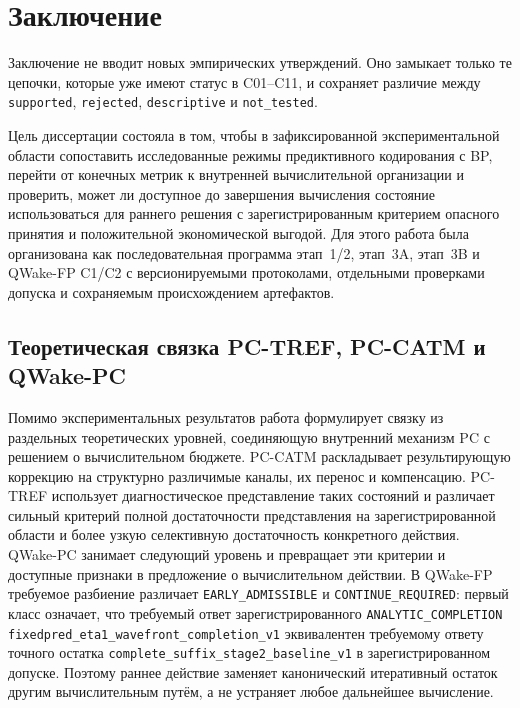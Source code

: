 \chapter{Заключение}
\label{ch:conclusion}

Заключение не вводит новых эмпирических утверждений. Оно замыкает только те
цепочки, которые уже имеют статус в C01--C11, и сохраняет различие между
\texttt{supported}, \texttt{rejected}, \texttt{descriptive} и
\texttt{not\_tested}.

Цель диссертации состояла в том, чтобы в зафиксированной экспериментальной
области сопоставить исследованные режимы предиктивного кодирования с BP,
перейти от конечных метрик к внутренней вычислительной организации и проверить,
может ли доступное до завершения вычисления состояние использоваться для
раннего решения с зарегистрированным критерием опасного принятия и положительной
экономической выгодой. Для этого работа была
организована как последовательная программа этап~1/2, этап~3A, этап~3B и
QWake-FP C1/C2 с версионируемыми протоколами, отдельными проверками допуска и
сохраняемым происхождением артефактов.

\section{Теоретическая связка PC-TREF, PC-CATM и QWake-PC}

Помимо экспериментальных результатов работа формулирует связку из раздельных
теоретических уровней, соединяющую внутренний механизм PC с решением о
вычислительном бюджете. PC-CATM раскладывает результирующую коррекцию
на структурно различимые каналы, их перенос и компенсацию. PC-TREF использует
диагностическое представление таких состояний и различает сильный критерий
полной достаточности представления на зарегистрированной области и более узкую селективную достаточность
конкретного действия. QWake-PC занимает следующий уровень и превращает эти
критерии и доступные признаки в предложение о вычислительном действии. В
QWake-FP требуемое разбиение различает \texttt{EARLY\_ADMISSIBLE} и
\texttt{CONTINUE\_REQUIRED}: первый класс означает, что требуемый ответ
зарегистрированного \texttt{ANALYTIC\_COMPLETION}
\nolinkurl{fixedpred_eta1_wavefront_completion_v1} эквивалентен требуемому
ответу точного остатка \nolinkurl{complete_suffix_stage2_baseline_v1}
в зарегистрированном допуске. Поэтому раннее действие заменяет канонический
итеративный остаток другим вычислительным путём, а не устраняет любое дальнейшее
вычисление.

